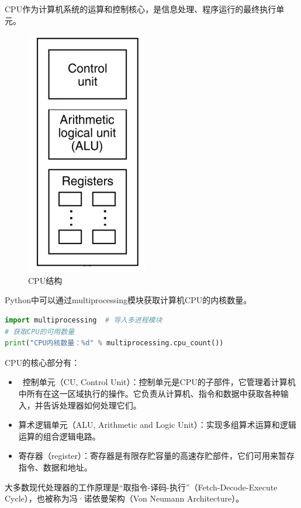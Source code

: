 CPU作为计算机系统的运算和控制核心，是信息处理、程序运行的最终执行单元。

\begin{figure}[H]
	\centering
	\includegraphics[scale=0.7]{img/C1/1-3/1.png}
	\caption{CPU结构}
\end{figure}

Python中可以通过multiprocessing模块获取计算机CPU的内核数量。 \\

\begin{lstlisting}[language=Python]
import multiprocessing	# 导入多进程模块
# 获取CPU的可用数量
print("CPU内核数量：%d" % multiprocessing.cpu_count())
\end{lstlisting}

CPU的核心部分有：

\begin{itemize}
	\item  控制单元（CU, Control Unit）：控制单元是CPU的子部件，它管理着计算机中所有在这一区域执行的操作。它负责从计算机、指令和数据中获取各种输入，并告诉处理器如何处理它们。

	\item 算术逻辑单元（ALU, Arithmetic and Logic Unit）：实现多组算术运算和逻辑运算的组合逻辑电路。

	\item 寄存器（register）：寄存器是有限存贮容量的高速存贮部件，它们可用来暂存指令、数据和地址。
\end{itemize}

大多数现代处理器的工作原理是“取指令-译码-执行”（Fetch-Decode-Execute Cycle），也被称为冯·诺依曼架构（Von Neumann Architecture）。

